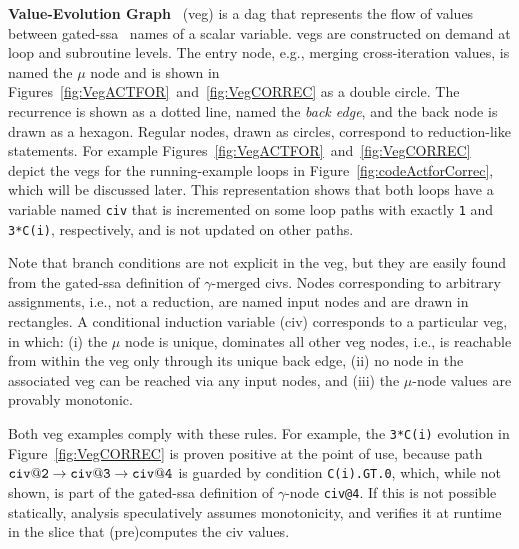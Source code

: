 \documentclass{sig-alternate}
\begin{document}
{\bf Value-Evolution Graph}~\cite{VEG} ({\sc veg}) is a {\sc dag}  %
that represents the flow of values between gated-{\sc ssa}~\cite{GatedSSA} names 
of a scalar variable.  
%
{\sc veg}s are constructed on demand at loop and subroutine levels.
%
The entry node, e.g., merging cross-iteration values,  is named 
the $\mu$ node and is shown in Figures~\ref{fig:VegACTFOR}~and~\ref{fig:VegCORREC} 
as a double circle. The recurrence is shown as a dotted line, 
named the {\em back edge}, and the back node is drawn as a hexagon.
%
Regular nodes, drawn as circles, correspond to reduction-like statements.
For example Figures~\ref{fig:VegACTFOR}~and~\ref{fig:VegCORREC} 
depict the {\sc veg}s for the running-example loops in 
Figure~\ref{fig:codeActforCorrec}, which will be discussed later. 
This representation shows that both loops
have a variable named {\tt civ} that is incremented on some loop
paths with exactly {\tt 1} and {\tt 3*C(i)}, respectively, 
and is not updated on other paths. 
%

Note that branch conditions are not explicit in the {\sc veg}, 
but they are easily found from the gated-{\sc ssa} definition 
of $\gamma$-merged {\sc civ}s. %
%
Nodes corresponding to arbitrary assignments, i.e., not a reduction, are
named input nodes and are drawn in rectangles. 
%
A conditional induction variable ({\sc civ}) corresponds to a
particular {\sc veg}, in which:
  (i) the $\mu$ node is unique, dominates all other {\sc veg} nodes,
            i.e., is reachable from within the {\sc veg} only through its
            unique back edge, %
%
 (ii) no node in the associated {\sc veg} can be reached via any input nodes, and 
%
(iii) the $\mu$-node values are provably monotonic.
            
Both {\sc veg} examples comply with these rules.
For example, the {\tt 3*C(i)} evolution in 
Figure~\ref{fig:VegCORREC} is proven positive at the 
point of use, because path 
${\tt civ@2}\rightarrow{\tt civ@3}\rightarrow{\tt civ@4}$
is guarded by condition {\tt C(i).GT.0}, which, while not 
shown, is part of the gated-{\sc ssa} definition of $\gamma$-node {\tt civ@4}. 
If this is not possible statically, analysis speculatively
assumes monotonicity, and verifies it at runtime in the slice 
that (pre)computes the {\sc civ} values. 
\end{document}
